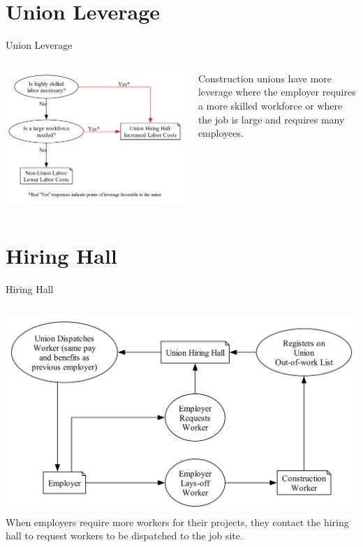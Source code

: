 \documentclass{beamer}
\begin{document}
\section{Union Leverage}
\begin{frame}{Union Leverage}
  \begin{columns}
    \includegraphics[width=\linewidth]{../images/union_power_red}

    Construction unions have more leverage where the employer requires a more skilled workforce or where the job is large and requires many employees.
  \end{columns}
\end{frame}

\section{Hiring Hall}
\begin{frame}{Hiring Hall}
	\begin{columns}
	\includegraphics[width=\linewidth]{../images/hiring_hall}
	When employers require more workers for their projects, they contact the hiring hall to request workers to be dispatched to the job site.
	\end{columns}
\end{frame}
\end{document}
